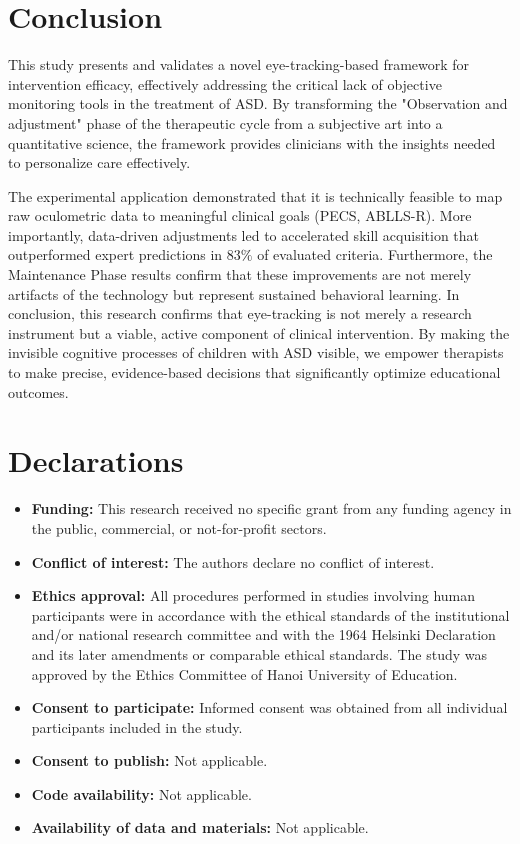 \section{Conclusion}
This study presents and validates a novel eye-tracking-based framework for intervention efficacy, effectively addressing the critical lack of objective monitoring tools in the treatment of ASD. By transforming the "Observation and adjustment" phase of the therapeutic cycle from a subjective art into a quantitative science, the framework provides clinicians with the insights needed to personalize care effectively.

The experimental application demonstrated that it is technically feasible to map raw oculometric data to meaningful clinical goals (PECS, ABLLS-R). More importantly, data-driven adjustments led to accelerated skill acquisition that outperformed expert predictions in $83\%$ of evaluated criteria. Furthermore, the Maintenance Phase results confirm that these improvements are not merely artifacts of the technology but represent sustained behavioral learning. In conclusion, this research confirms that eye-tracking is not merely a research instrument but a viable, active component of clinical intervention. By making the invisible cognitive processes of children with ASD visible, we empower therapists to make precise, evidence-based decisions that significantly optimize educational outcomes.

\section*{Declarations}
\begin{itemize}
    \item \textbf{Funding:} This research received no specific grant from any funding agency in the public, commercial, or not-for-profit sectors.
    \item \textbf{Conflict of interest: } The authors declare no conflict of interest.
    \item \textbf{Ethics approval: }All procedures performed in studies involving human participants were in accordance with the ethical standards of the institutional and/or national research committee and with the 1964 Helsinki Declaration and its later amendments or comparable ethical standards. The study was approved by the Ethics Committee of Hanoi University of Education.
    \item \textbf{Consent to participate: }Informed consent was obtained from all individual participants included in the study.
    \item \textbf{Consent to publish: }Not applicable.
    \item \textbf{Code availability: } Not applicable.
    \item \textbf{Availability of data and materials: }Not applicable.
\end{itemize}